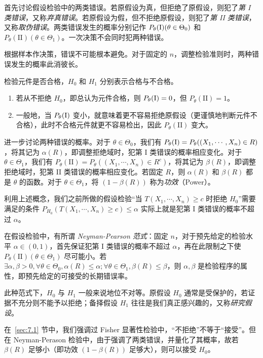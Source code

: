 \documentclass[../main.tex]{subfiles}
\begin{document}
首先讨论假设检验中的两类错误。若原假设为真，但拒绝了原假设，则犯了\emph{第 I 类错误}，又称\emph{弃真错误}。若原假设为假，但不拒绝原假设，则犯了\emph{第 II 类错误}，又称\emph{取伪错误}。两类错误发生的概率分别记作 $P_\theta(\text I)(\theta\in\Theta_0)$ 和 $P_\theta(\text{II})(\theta\in\Theta_1)$。一次决策不会同时犯两种错误。

根据样本作决策，错误不可能根本避免。对于固定的 $n$，调整检验准则时，两种错误发生的概率此消彼长。

\begin{example}
    检验元件是否合格，$H_0$ 和 $H_1$ 分别表示合格与不合格。
    \begin{enumerate}
        \item 若从不拒绝 $H_0$，即总认为元件合格，则 $P_\theta(\text I)=0$，但 $P_\theta(\text{II})=1$。
        \item 一般地，当 $P_\theta(\text I)$ 变小，就意味着更不容易拒绝原假设（更谨慎地判断元件不合格），此时不合格元件就更不容易检出，因此 $P_\theta(\text{II})$ 变大。
    \end{enumerate}
\end{example}

进一步讨论两种错误的概率。对于 $\theta\in\Theta_0$，我们有 $P_\theta(\text I)=P_\theta((X_1,\cdots,X_n)\in R)$，将其记为 $\alpha(R)$，即调整拒绝域时，犯第 I 类错误的概率相应变化。对于 $\theta\in\Theta_1$，我们有 $P_\theta(\text{II})=P_\theta((X_1,\cdots,X_n)\in R^c)$，将其记为 $\beta(R)$，即调整拒绝域时，犯第 II 类错误的概率相应变化。若固定 $R$，则 $\alpha(R)$ 和 $\beta(R)$ 都是 $\theta$ 的函数。对于 $\theta\in\Theta_1$，将 $(1-\beta(R))$ 称为\emph{功效}（Power）。

利用上述概念，我们之前所做的假设检验“当 $T(X_1,\cdots,X_n)\geq c$ 时拒绝 $H_0$”需要满足的条件 $P_{H_0}(T(X_1,\cdots,X_n)\geq c)\leq\alpha$ 实际上就是犯第 I 类错误的概率不超过 $\alpha$。

在假设检验中，有所谓 \emph{Neyman-Pearson 范式}：固定 $n$，对于预先给定的检验水平 $\alpha\in(0,1)$，首先保证犯第 I 类错误的概率不超过 $\alpha$，再在此限制之下使 $P_\theta(\text{II})(\theta\in\Theta_1)$ 尽可能小。若 $\exists\alpha,\beta>0,\forall\theta\in\Theta_0,\alpha(R)\leq\alpha;\forall\theta\in\Theta_1,\beta(R)\leq\beta$，则 $\alpha,\beta$ 是检验程序的属性，即预先给定的可接受的长期错误率。

此种范式下，$H_0$ 与 $H_1$ 一般来说地位不对等。原假设 $H_0$ 通常是受保护的，若证据不充分则不能予以拒绝；备择假设 $H_1$ 往往是我们真正感兴趣的，又称\emph{研究假设}。

在~\ref{sec:7.1} 节中，我们强调过 Fisher 显著性检验中，“不拒绝”不等于“接受”。但在 Neyman-Perason 检验中，由于强调了两类错误，并量化了其概率，故若 $\beta(R)$ 足够小（即功效 $(1-\beta(R))$ 足够大），则可以接受 $H_0$。
\end{document}
